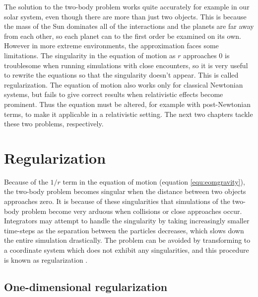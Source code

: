 \documentclass[english, oneside]{HYgradu}
\begin{document}
The solution to the two-body problem works quite accurately for example in our solar system, even though there are more than just two objects. This is because the mass of the Sun dominates all of the interactions and the planets are far away from each other, so each planet can to the first order be examined on its own. However in more extreme environments, the approximation faces some limitations. The singularity in the equation of motion as $r$ approaches 0 is troublesome when running simulations with close encounters, so it is very useful to rewrite the equations so that the singularity doesn't appear. This is called regularization. The equation of motion also works only for classical Newtonian systems, but fails to give correct results when relativistic effects become prominent. Thus the equation must be altered, for example with post-Newtonian terms, to make it applicable in a relativistic setting. The next two chapters tackle these two problems, respectively.


\section{Regularization}

Because of the $1/r$ term in the equation of motion (equation \ref{equ:eomgravity}), the two-body problem becomes singular when the distance between two objects approaches zero. It is because of these singularities that simulations of the two-body problem become very arduous when collisions or close approaches occur. Integrators may attempt to handle the singularity by taking increasingly smaller time-steps as the separation between the particles decreases, which slows down the entire simulation drastically. The problem can be avoided by transforming to a coordinate system which does not exhibit any singularities, and this procedure is known as regularization \citep{bt-galdyn}. 

\subsection{One-dimensional regularization}
\end{document}
